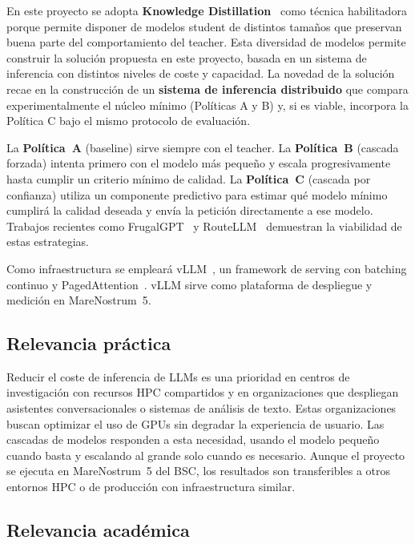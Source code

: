 \documentclass[11pt,a4paper]{article}
\begin{document}
En este proyecto se adopta \textbf{Knowledge Distillation}~\cite{hinton2015distilling} como técnica habilitadora porque permite disponer de modelos student de distintos tamaños que preservan buena parte del comportamiento del teacher. Esta diversidad de modelos permite construir la solución propuesta en este proyecto, basada en un sistema de inferencia con distintos niveles de coste y capacidad. La novedad de la solución recae en la construcción de un \textbf{sistema de inferencia distribuido} que compara experimentalmente el núcleo mínimo (Políticas A y B) y, si es viable, incorpora la Política C bajo el mismo protocolo de evaluación.

La \textbf{Política~A} (baseline) sirve siempre con el teacher. La \textbf{Política~B} (cascada forzada) intenta primero con el modelo más pequeño y escala progresivamente hasta cumplir un criterio mínimo de calidad. La \textbf{Política~C} (cascada por confianza) utiliza un componente predictivo para estimar qué modelo mínimo cumplirá la calidad deseada y envía la petición directamente a ese modelo. Trabajos recientes como FrugalGPT~\cite{chen2023frugalgpt} y RouteLLM~\cite{dekoninck2024routing} demuestran la viabilidad de estas estrategias.

Como infraestructura se empleará vLLM~\cite{vllm-docs}, un framework de serving con batching continuo y PagedAttention~\cite{vllm2023}. vLLM sirve como plataforma de despliegue y medición en MareNostrum~5.

\subsection{Relevancia práctica}

Reducir el coste de inferencia de LLMs es una prioridad en centros de investigación con recursos HPC compartidos y en organizaciones que despliegan asistentes conversacionales o sistemas de análisis de texto. Estas organizaciones buscan optimizar el uso de GPUs sin degradar la experiencia de usuario. Las cascadas de modelos responden a esta necesidad, usando el modelo pequeño cuando basta y escalando al grande solo cuando es necesario. Aunque el proyecto se ejecuta en MareNostrum~5 del BSC, los resultados son transferibles a otros entornos HPC o de producción con infraestructura similar.

\subsection{Relevancia académica}
\end{document}
